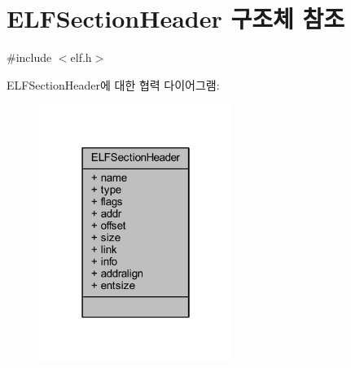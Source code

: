 \hypertarget{struct_e_l_f_section_header}{}\section{E\+L\+F\+Section\+Header 구조체 참조}
\label{struct_e_l_f_section_header}


{\ttfamily \#include $<$elf.\+h$>$}



E\+L\+F\+Section\+Header에 대한 협력 다이어그램\+:\nopagebreak
\begin{figure}[H]
\begin{center}
\leavevmode
\includegraphics[width=178pt]{struct_e_l_f_section_header__coll__graph}
\end{center}
\end{figure}
